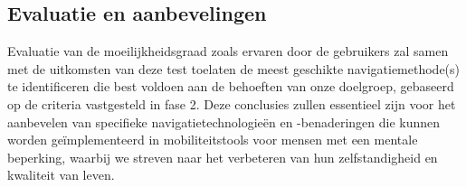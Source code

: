    \subsection*{Evaluatie en aanbevelingen}
    
    Evaluatie van de moeilijkheidsgraad zoals ervaren door de gebruikers zal samen met de uitkomsten van deze test toelaten de meest geschikte navigatiemethode(s) te identificeren die best voldoen aan de behoeften van onze doelgroep, gebaseerd op de criteria vastgesteld in fase 2. Deze conclusies zullen essentieel zijn voor het aanbevelen van specifieke navigatietechnologieën en -benaderingen die kunnen worden geïmplementeerd in mobiliteitstools voor mensen met een mentale beperking, waarbij we streven naar het verbeteren van hun zelfstandigheid en kwaliteit van leven.

